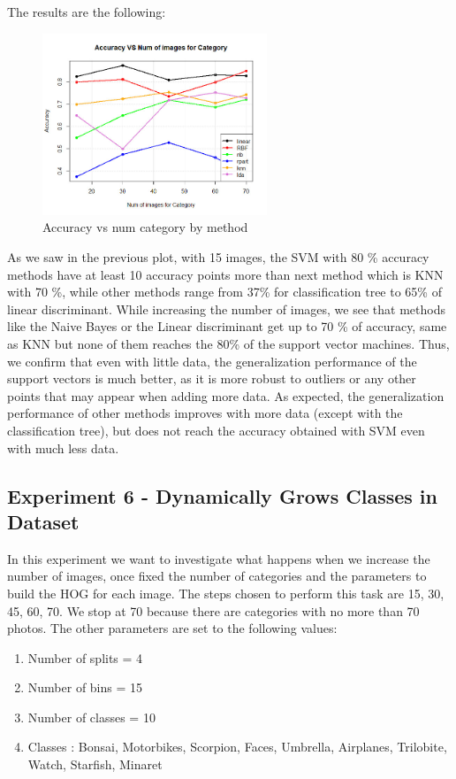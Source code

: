 The results are the following:

\begin{figure}[H]
\centering
\includegraphics[width=0.6\textwidth]{Images/WhatsApp.jpeg}
\caption{Accuracy vs num category by method}
\end{figure}

As we saw in the previous plot, with 15 images, the SVM with 80 \% accuracy methods have at least 10 accuracy points more than next method which is KNN with 70 \%, while other methods range from 37\% for classification tree to 65\% of linear discriminant. While increasing the number of images, we see that methods like the Naive Bayes or the Linear discriminant get up to 70 \% of accuracy, same as KNN but none of them reaches the 80\% of the support vector machines. Thus, we confirm that even with little data, the generalization performance of the support vectors is much better, as it is more robust to outliers or any other points that may appear when adding more data. As expected, the generalization performance of other methods improves with more data (except with the classification tree), but does not reach the accuracy obtained with SVM even with much less data. 

\subsection{Experiment 6 - Dynamically Grows Classes in Dataset} \label{experiment_6}
In this experiment we want to investigate what happens when we increase the number of images, once fixed the number of categories and the parameters to build the HOG for each image. 
The steps chosen to perform this task are 15, 30, 45, 60, 70. We stop at 70 because there are categories with no more than 70 photos.
The other parameters are set to the following values:
\begin{enumerate}
    \item Number of splits = 4
    \item Number of bins = 15
    \item Number of classes = 10
    \item Classes :  Bonsai, Motorbikes, Scorpion, Faces,  Umbrella, Airplanes, Trilobite, Watch, Starfish, Minaret
\end{enumerate}

